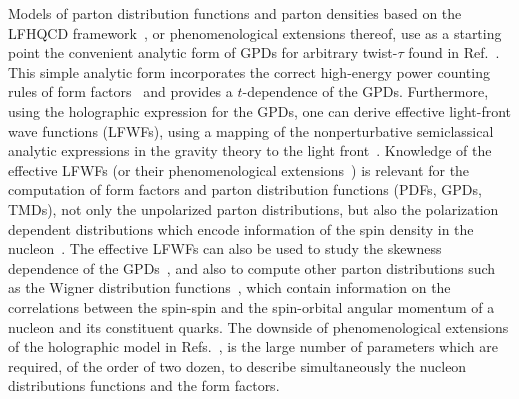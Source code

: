 \documentclass[aps,prd,preprint,groupedaddress]{revtex4-1}
\begin{document}
Models of parton distribution functions and parton densities based on the LFHQCD framework~\cite{Abidin:2008sb, Vega:2010ns, Gutsche:2013zia, Chakrabarti:2013gra, Sharma:2014voa, Dehghani:2015jva, Mondal:2015uha, Chakrabarti:2015lba, Maji:2015vsa, Mondal:2015fok, Chakrabarti:2016yuw, Chakrabarti:2016yuw, Mondal:2016xsm, Maji:2016yqo, Traini:2016jko, Traini:2016jru, Gutsche:2016gcd, Maji:2017ill, Rinaldi:2017roc, Bacchetta:2017vzh, Mondal:2017lph, Huang:2017gih, Nikkhoo:2017won, Mondal:2017wbf},  or phenomenological extensions thereof, use as a starting point the convenient analytic form of GPDs  for arbitrary twist-$\tau$ found in Ref.~\cite{Brodsky:2007hb}.  This simple analytic form incorporates the correct high-energy power counting rules of form factors~\cite{exclusive-inclusive} and provides a $t$-dependence of the GPDs. Furthermore, using the holographic expression for the GPDs, one can derive effective light-front wave functions (LFWFs), using a  mapping of the  nonperturbative semiclassical analytic expressions in the gravity theory to the light front~\cite{Brodsky:2011xx, deTeramond:2012rt}. Knowledge of the effective LFWFs (or their phenomenological extensions~\cite{Gutsche:2013zia}) is relevant for the computation of form factors and parton distribution functions (PDFs, GPDs, TMDs), not only the  unpolarized parton distributions, but also the  polarization dependent distributions which encode information of the spin density in the nucleon~\cite{Maji:2017ill, Gutsche:2016gcd, Nikkhoo:2017won}. The effective LFWFs can also be used to study the skewness dependence of the GPDs~\cite{Traini:2016jko, Rinaldi:2017roc, Mondal:2017wbf}, and also to compute other parton distributions such as the Wigner distribution functions~\cite{Chakrabarti:2016yuw, Gutsche:2016gcd}, which contain information on the correlations between the spin-spin and the spin-orbital angular momentum of a nucleon and its constituent quarks. The downside of  phenomenological extensions of the holographic model in Refs.~\cite{Gutsche:2013zia, Chakrabarti:2013gra, Sharma:2014voa, Dehghani:2015jva, Mondal:2015uha, Chakrabarti:2015lba, Maji:2015vsa, Mondal:2015fok, Chakrabarti:2016yuw, Chakrabarti:2016yuw, Mondal:2016xsm, Maji:2016yqo,  Gutsche:2016gcd, Maji:2017ill,  Mondal:2017lph, Nikkhoo:2017won}, is the large number of parameters which are required, of the order of two dozen,  to describe simultaneously the nucleon distributions functions and the form factors.
\end{document}
